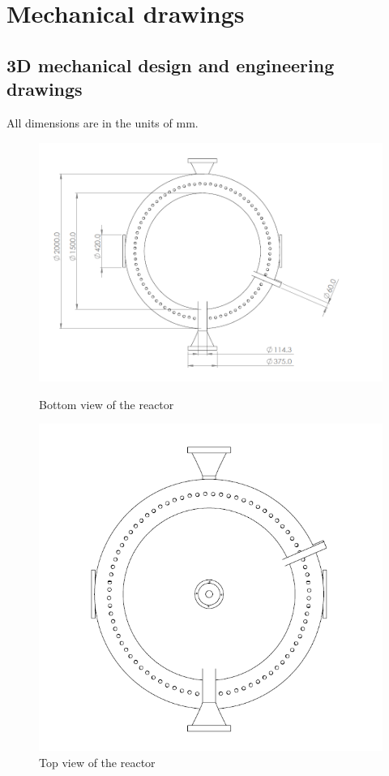 \section{Mechanical drawings}
\label{app:reactor-drawings}
\subsection{3D mechanical design and engineering drawings}
\label{app:engineeringdesign}
All dimensions are in the units of mm.
\begin{figure}[h]
    \begin{minipage}[t]{0.6\linewidth}
        \includegraphics[width=\linewidth]{chapters/2-reaction/figures/FYD reactor bottom view with calc.PNG}
        \caption{Bottom view of the reactor}
        \label{fig:reactorbottom}
    \end{minipage}\hfill
    \begin{minipage}[t]{0.4\linewidth}
        \includegraphics[width=\linewidth]{chapters/2-reaction/figures/FYD reactor top view.PNG}
        \caption{Top view of the reactor}
        \label{fig:reactortop}
    \end{minipage}
\end{figure}
